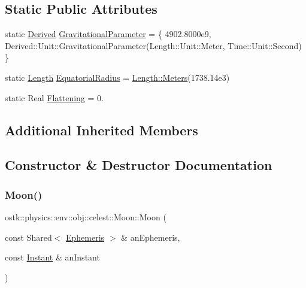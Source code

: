 \subsection*{Static Public Attributes}
\begin{DoxyCompactItemize}
\item 
static \hyperlink{classostk_1_1physics_1_1units_1_1_derived}{Derived} \hyperlink{classostk_1_1physics_1_1env_1_1obj_1_1celest_1_1_moon_ad9b61b93eb0855dce7f969d68932f5c6}{Gravitational\+Parameter} = \{ 4902.\+8000e9, Derived\+::\+Unit\+::\+Gravitational\+Parameter(\+Length\+::\+Unit\+::\+Meter, Time\+::\+Unit\+::\+Second) \}
\item 
static \hyperlink{classostk_1_1physics_1_1units_1_1_length}{Length} \hyperlink{classostk_1_1physics_1_1env_1_1obj_1_1celest_1_1_moon_a955cccb5f9056296a10d4f7ea879e185}{Equatorial\+Radius} = \hyperlink{classostk_1_1physics_1_1units_1_1_length_ad227977ce00756791595796a0dd5ddd7}{Length\+::\+Meters}(1738.\+14e3)
\item 
static Real \hyperlink{classostk_1_1physics_1_1env_1_1obj_1_1celest_1_1_moon_ab66267b7075ad71aff5cbbe2469ef32c}{Flattening} = 0.
\end{DoxyCompactItemize}
\subsection*{Additional Inherited Members}


\subsection{Constructor \& Destructor Documentation}
\mbox{\label{classostk_1_1physics_1_1env_1_1obj_1_1celest_1_1_moon_ad8fdde672c99f064ea7ad3e6d3d8451c}} 
\subsubsection{\texorpdfstring{Moon()}{Moon()}}
{\footnotesize\ttfamily ostk\+::physics\+::env\+::obj\+::celest\+::\+Moon\+::\+Moon (\begin{DoxyParamCaption}\item[{const Shared$<$ \hyperlink{classostk_1_1physics_1_1env_1_1_ephemeris}{Ephemeris} $>$ \&}]{an\+Ephemeris,  }\item[{const \hyperlink{classostk_1_1physics_1_1time_1_1_instant}{Instant} \&}]{an\+Instant }\end{DoxyParamCaption})}

